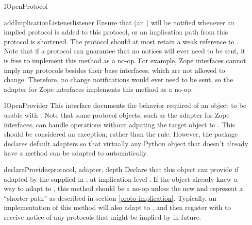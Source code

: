 \begin{verbatim%
}
\begin{verbatim%
}
\begin{verbatim%
}
\begin{verbatim%
}
\begin{classdesc*}{IOpenProtocol}
\begin{methoddesc}{addImplicationListener}{listener}
Ensure that  (an ) will be notified
whenever an implied protocol is added to this protocol, or an implication path
from this protocol is shortened.  The protocol should at most retain a weak
reference to .  Note that if a protocol can guarantee that no
notices will ever need to be sent, it is free to implement this method as a
no-op.  For example, Zope interfaces cannot imply any protocols besides their
base interfaces, which are not allowed to change.  Therefore, no change
notifications would ever need to be sent, so the  adapter
for Zope interfaces implements this method as a no-op.
\end{methoddesc}



\end{classdesc*}












\begin{classdesc*}{IOpenProvider}
This interface documents the behavior required of an object to be usable with
.  Note that some protocol objects, such as the
 adapter for Zope interfaces, can handle
 operations without adpating the target object to
.  This should be considered an exception, rather than the
rule.  However, the  package declares default adapters so
that virtually any Python object that doesn't already have a
 method can be adapted to 
automatically.

\begin{methoddesc}{declareProvides}{protocol, adapter, depth}
Declare that this object can provide  if adapted by the
 supplied in , at implication level
.  If the object already knew a way to adapt to , this
method should be a no-op unless the new  and  represent
a ``shorter path'' as described in section \ref{proto-implication}.  Typically,
an implementation of this method will also adapt  to
, and then register with 
to receive notice of any protocols that might be implied by 
in future.
\end{methoddesc}


\end{classdesc*}
\end{verbatim%
}
\end{verbatim%
}
\end{verbatim%
}
\end{verbatim%
}
